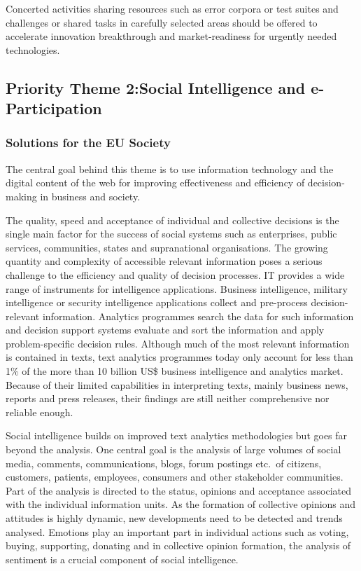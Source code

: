 \documentclass[10pt, plain]{../../metanetpaper}
\begin{document}
\begin{multicols}{2}
Concerted activities sharing resources such as error corpora or test suites and challenges or shared tasks in carefully selected areas should be offered to accelerate innovation breakthrough and market-readiness for urgently needed technologies.

\subsection[Priority Theme 2: Social Intelligence and e-Participation]{Priority Theme 2:\newline Social Intelligence and e-Participation}
\label{sec:priority-theme-2-social-intelligence}

\subsubsection{Solutions for the EU Society}
\label{sec:solutions-eu-society-pt2}

The central goal behind this theme is to use information technology and the digital content of the web for improving effectiveness and efficiency of decision-making in business and society. 
 
The quality, speed and acceptance of individual and collective decisions is the single main factor for the success of social systems such as enterprises, public services, communities, states and supranational organisations. The growing quantity and complexity of accessible relevant information poses a serious challenge to the efficiency and quality of decision processes. IT provides a wide range of instruments for intelligence applications. Business intelligence, military intelligence or security intelligence applications collect and pre-process decision-relevant information. Analytics programmes search the data for such information and decision support systems evaluate and sort the information and apply problem-specific decision rules. Although much of the most relevant information is contained in texts, text analytics programmes today only account for less than 1\% of the more than 10 billion US\$ business intelligence and analytics market. Because of their limited capabilities in interpreting texts, mainly business news, reports and press releases, their findings are still neither comprehensive nor reliable enough.
 
Social intelligence builds on improved text analytics methodologies but goes far beyond the analysis. One central goal is the analysis of large volumes of social media, comments, communications, blogs, forum postings etc.~of citizens, customers, patients, employees, consumers and other stakeholder communities. Part of the analysis is directed to the status, opinions and acceptance associated with the individual information units. As the formation of collective opinions and attitudes is highly dynamic, new developments need to be detected and trends analysed. Emotions play an important part in individual actions such as voting, buying, supporting, donating and in collective opinion formation, the analysis of sentiment is a crucial component of social intelligence.  
 

\end{multicols}
\end{document}
